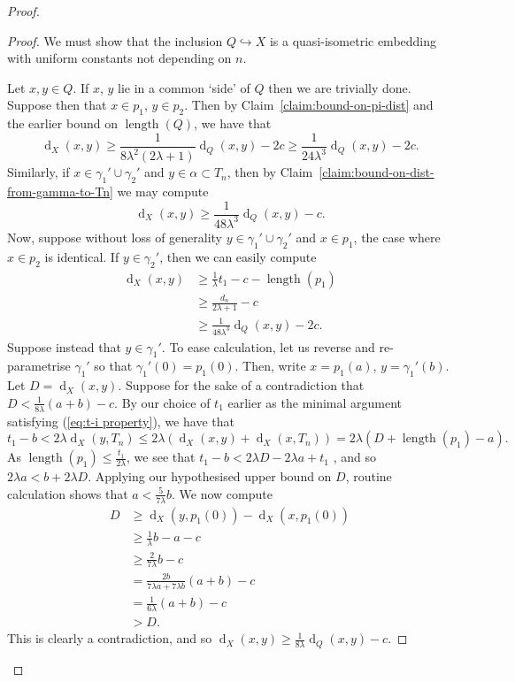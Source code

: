 \documentclass[11pt,a4paper]{amsart}
\DeclareMathOperator{\length}{length}
\DeclareMathOperator{\dist}{d}
\newcommand{\into}{\hookrightarrow}
\theoremstyle{definition}
\begin{document}
\begin{proof}
    \begin{proof}
        We must show that the inclusion $Q \into X$ is a quasi-isometric embedding with uniform constants not depending on $n$. 
        
        Let $x,y \in Q$. If $x$, $y$ lie in a common `side' of $Q$ then we are trivially done. Suppose then that $x \in p_1$, $y \in p_2$. Then by Claim~\ref{claim:bound-on-pi-dist} and the earlier bound on $\length(Q)$, we have that 
        $$
        \dist_X(x,y) \geq \frac{1}{8\lambda^2(2\lambda+1)} \dist_Q(x,y) - 2c \geq \frac 1 {24\lambda^3} \dist_Q(x,y) - 2c.
        $$
        Similarly, if $x \in \gamma_1' \cup \gamma_2'$ and $y \in \alpha \subset T_n$, then by Claim~\ref{claim:bound-on-dist-from-gamma-to-Tn} we may compute
        $$
        \dist_X(x,y) \geq \frac 1 {48\lambda^3} \dist_Q(x,y) - c.
        $$
        Now, suppose without loss of generality $y \in \gamma_1' \cup \gamma_2'$ and $x \in p_1$, the case where $x \in p_2$ is identical. 
        If $y \in \gamma_2'$, then we can easily compute 
        \begin{align*}
            \dist_X(x,y) &\geq \frac 1 \lambda t_1 - c - \length(p_1) \\
            &\geq \frac{d_n}{2\lambda+1} - c \\
            & \geq \frac{1}{48\lambda^3} \dist_Q(x,y) - 2c.
        \end{align*}
        Suppose instead that $y \in \gamma_1'$. To ease calculation, let us reverse and re-parametrise $\gamma_1'$ so that $\gamma_1'(0) = p_1(0)$. Then, write $x = p_1(a)$, $y = \gamma_1'(b)$. Let $D = \dist_X(x,y)$. 
        Suppose for the sake of a contradiction that $D < \frac 1 {8\lambda} (a+b) - c$.
        By our choice of $t_1$ earlier as the minimal argument satisfying (\ref{eq:t-i property}), we have that 
        $$
            t_1 - b < 2\lambda \dist_X(y, T_n) \leq 2\lambda (\dist_X(x,y) + \dist_X(x,T_n)) = 2\lambda(D + \length(p_1) - a).
        $$
        As $\length(p_1) \leq \frac {t_1}{2\lambda}$, we see that
        $t_1 - b < 2\lambda D - 2\lambda a + t_1$ , and so $2\lambda a < b + 2\lambda D$. 
        Applying our hypothesised upper bound on $D$, routine  calculation shows that 
        $
        a < \frac 5{7\lambda} b
        $. 
        We now compute 
        \begin{align*}
            D &\geq \dist_X(y,p_1(0)) - \dist_X(x,p_1(0)) \\
            &\geq \frac 1 \lambda b - a - c \\
            &\geq \frac 2 {7\lambda }b - c \\
            &= \frac {2b}{7\lambda a + 7\lambda b}(a+b) - c \\
            &= \frac {1}{6\lambda}(a+b) - c \\
            &> D.
        \end{align*}
        This is clearly a contradiction, and so $\dist_X(x,y) \geq \frac 1 {8\lambda} \dist_Q(x,y) -c$.
        

\end{proof}
\end{proof}
\end{document}
